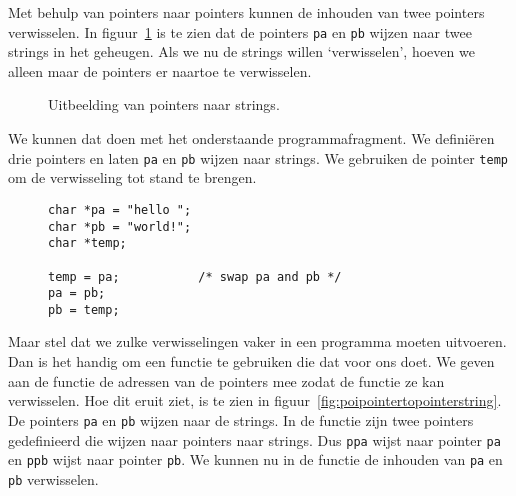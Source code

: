 Met behulp van pointers naar pointers kunnen de inhouden van twee pointers verwisselen. In figuur~\ref{fig:poipointertostring} is te zien dat de pointers \texttt{pa} en \texttt{pb} wijzen naar twee strings in het geheugen. Als we nu de strings willen `verwisselen', hoeven we alleen maar de pointers er naartoe te verwisselen.

\begin{figure}[!ht]
\centering
{}
\caption{Uitbeelding van pointers naar strings.}
\label{fig:poipointertostring}
\end{figure}

We kunnen dat doen met het onderstaande programmafragment. We definiëren drie pointers en laten \texttt{pa} en \texttt{pb} wijzen naar strings. We gebruiken de pointer \texttt{temp} om de verwisseling tot stand te brengen.

\begin{figure}[H]
\begin{lstlisting}[caption=Verwisselen van twee pointers.]
char *pa = "hello ";
char *pb = "world!";
char *temp;

temp = pa;           /* swap pa and pb */
pa = pb;
pb = temp;
\end{lstlisting}
\end{figure}

Maar stel dat we zulke verwisselingen vaker in een programma moeten uitvoeren. Dan is het handig om een functie te gebruiken die dat voor ons doet. We geven aan de functie de adressen van de pointers mee zodat de functie ze kan verwisselen. Hoe dit eruit ziet, is te zien in figuur~\ref{fig:poipointertopointerstring}. De pointers \texttt{pa} en \texttt{pb} wijzen naar de strings. In de functie zijn twee pointers gedefinieerd die wijzen naar pointers naar strings. Dus \texttt{ppa} wijst naar pointer \texttt{pa} en \texttt{ppb} wijst naar pointer \texttt{pb}. We kunnen nu in de functie de inhouden van \texttt{pa} en \texttt{pb} verwisselen.

